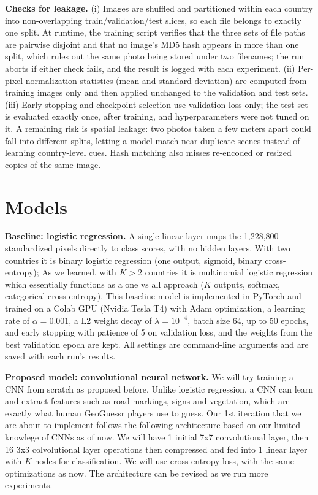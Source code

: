 \documentclass[conference]{IEEEtran}
\begin{document}
\textbf{Checks for leakage. } (i) Images are shuffled and partitioned within each country into
  non-overlapping train/validation/test slices, so each file belongs to
  exactly one split. At runtime, the training script verifies that the
  three sets of file paths are pairwise disjoint and that no image's MD5
  hash appears in more than one split, which rules out the same photo
  being stored under two filenames; the run aborts if either check fails,
  and the result is logged with each experiment.
  (ii) Per-pixel normalization statistics (mean and standard deviation)
  are computed from training images only and then applied unchanged to
  the validation and test sets.
  (iii) Early stopping and checkpoint selection use validation loss only;
  the test set is evaluated exactly once, after training, and
  hyperparameters were not tuned on it.
  A remaining risk is spatial leakage: two photos taken a few meters
  apart could fall into different splits, letting a model match
  near-duplicate scenes instead of learning country-level cues. Hash
  matching also misses re-encoded or resized copies of the same image.



\section{Models}

\textbf{Baseline: logistic regression.} A single linear layer maps the
1,228,800 standardized pixels directly to class scores, with no hidden layers.
With two countries it is binary logistic regression (one output, sigmoid,
binary cross-entropy); As we learned, with $K>2$ countries it is multinomial logistic regression which essentially functions as a one vs all approach ($K$ outputs, softmax, categorical cross-entropy). This baseline model is
implemented in PyTorch and trained on a Colab GPU (Nvidia Tesla T4) with Adam optimization, a learning rate of
$\alpha = 0.001$, a L2 weight decay  of $\lambda = 10^{-4}$, batch size 64, up to 50 epochs, and early
stopping with patience  of 5 on validation loss, and the weights from the best
validation epoch are kept. All settings are command-line arguments and are
saved with each run's results.

\textbf{Proposed model: convolutional neural network.} We will try training a CNN from scratch as proposed before. Unlike logistic regression, a CNN can learn and extract features such as road markings, signs and vegetation, which are exactly what human GeoGuessr players use to guess. Our 1st iteration that we are about to implement follows the following architecture based on our limited knowlege of CNNs as of now. We will have 1 initial 7x7 convolutional layer, then 16 3x3 colvolutional layer operations then compressed and fed into 1 linear layer with $K$ nodes for classification. We will use cross entropy loss, with the same optimizations as now. The architecture can be revised as we run more experiments. 
\end{document}

